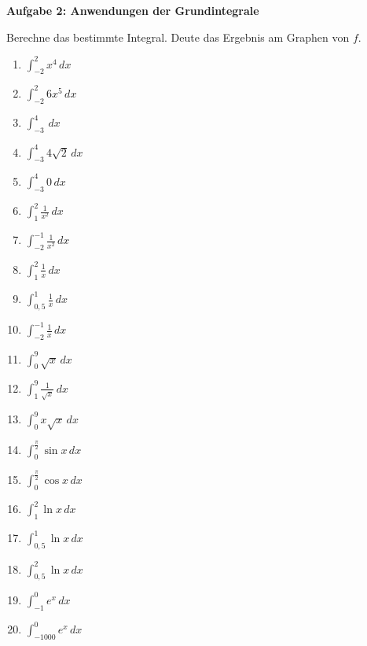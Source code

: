 \documentclass[a4paper,12pt]{article}
\newcommand{\Aufgabe}[1]{
  {
  \vspace*{0.5cm}
  \textsf{\textbf{Aufgabe #1}}
  \vspace*{0.2cm}
  
  }
}
\begin{document}
\Aufgabe{2: Anwendungen der Grundintegrale}
Berechne das bestimmte Integral. Deute das Ergebnis am Graphen von $f$.
\begin{enumerate}[label={\alph*)}, topsep=5pt,itemsep=4ex,partopsep=1ex,parsep=1ex]
  \item $\int_{-2}^{2} x^4\,dx$
  \item $\int_{-2}^{2} 6x^5\,dx$
  \item $\int_{-3}^{4}\,dx$
  \item $\int_{-3}^{4}4\sqrt{2}\,dx$
  \item $\int_{-3}^{4}0\,dx$
  \item $\int_{1}^{2}\frac{1}{x^2}\,dx$
  \item $\int_{-2}^{-1}\frac{1}{x^2}\,dx$
  \item $\int_{1}^{2}\frac{1}{x}\,dx$
  \item $\int_{0,5}^{1}\frac{1}{x}\,dx$
  \item $\int_{-2}^{-1}\frac{1}{x}\,dx$
  \item $\int_{0}^{9}\sqrt{x}\,dx$
  \item $\int_{1}^{9}\frac{1}{\sqrt{x}}\,dx$
  \item $\int_{0}^{9}x\sqrt{x}\,dx$
  \item $\int_{0}^{\frac{\pi}{2}}\sin{x}\,dx$
  \item $\int_{0}^{\frac{\pi}{2}}\cos{x}\,dx$
  \item $\int_{1}^{2}\ln{x}\,dx$
  \item $\int_{0,5}^{1}\ln{x}\,dx$
  \item $\int_{0,5}^{2}\ln{x}\,dx$
  \item $\int_{-1}^{0}e^x\,dx$
  \item $\int_{-1000}^{0}e^x\,dx$
\end{enumerate}
\end{document}
